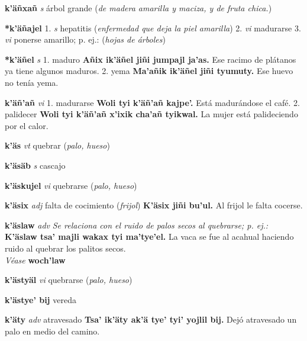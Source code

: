 \documentclass[10pt]{scrbook}
\newcommand{\entry}[1]{\textbf{#1}}
\newcommand{\onedefinition}[1]{#1.}
\newcommand{\nontranslationdef}[1]{\textit{#1}}
\newcommand{\partofspeech}[1]{\textit{#1}}
\newcommand{\spanishtranslation}[1]{#1}
\newcommand{\clarification}[1]{(\textit{#1})}
\newcommand{\cholexample}[1]{\textbf{#1}}
\newcommand{\exampletranslation}[1]{#1}
\newcommand{\alsosee}[1]{\\\textit{Véase} \textbf{#1}}
\begin{document}
\begin{multicols}{2}
\entry{k'äñxañ}
\partofspeech{s}
\spanishtranslation{árbol grande}
\clarification{de madera amarilla y maciza, y de fruta chica.}

\entry{*k'äñajel}
\onedefinition{1}
\partofspeech{s}
\spanishtranslation{hepatitis}
\clarification{enfermedad que deja la piel amarilla}
\onedefinition{2}
\partofspeech{vi}
\spanishtranslation{madurarse}
\onedefinition{3}
\partofspeech{vi}
\spanishtranslation{ponerse amarillo; p. ej.:}
\clarification{hojas de árboles}

\entry{*k'äñel}
\partofspeech{s}
\onedefinition{1}
\spanishtranslation{maduro}
\cholexample{Añix ik'äñel jiñi jumpajl ja'as.}
\exampletranslation{Ese racimo de plátanos ya tiene algunos maduros.}
\onedefinition{2}
\spanishtranslation{yema}
\cholexample{Ma'añik ik'äñel jiñi tyumuty.}
\exampletranslation{Ese huevo no tenía yema.}

\entry{k'äñ'añ}
\partofspeech{vi}
\onedefinition{1}
\spanishtranslation{madurarse}
\cholexample{Woli tyi k'äñ'añ kajpe'.}
\exampletranslation{Está madurándose el café.}
\onedefinition{2}
\spanishtranslation{palidecer}
\cholexample{Woli tyi k'äñ'añ x'ixik cha'añ tyikwal.}
\exampletranslation{La mujer está palideciendo por el calor.}

\entry{k'äs}
\partofspeech{vt}
\spanishtranslation{quebrar}
\clarification{palo, hueso}

\entry{k'äsäb}
\partofspeech{s}
\spanishtranslation{cascajo}

\entry{k'äskujel}
\partofspeech{vi}
\spanishtranslation{quebrarse}
\clarification{palo, hueso}

\entry{k'äsix}
\partofspeech{adj}
\spanishtranslation{falta de cocimiento}
\clarification{frijol}
\cholexample{K'äsix jiñi bu'ul.}
\exampletranslation{Al frijol le falta cocerse.}

\entry{k'äslaw}
\partofspeech{adv}
\nontranslationdef{Se relaciona con el ruido de palos secos al quebrarse; p. ej.:}
\cholexample{K'äslaw tsa' majli wakax tyi ma'tye'el.}
\exampletranslation{La vaca se fue al acahual haciendo ruido al quebrar los palitos secos.}
\alsosee{woch'law}

\entry{k'ästyäl}
\partofspeech{vi}
\spanishtranslation{quebrarse}
\clarification{palo, hueso}

\entry{k'ästye' bij}
\spanishtranslation{vereda}

\entry{k'äty}
\partofspeech{adv}
\spanishtranslation{atravesado}
\cholexample{Tsa' ik'äty ak'ä tye' tyi' yojlil bij.}
\exampletranslation{Dejó atravesado un palo en medio del camino.}


\end{multicols}
\end{document}
